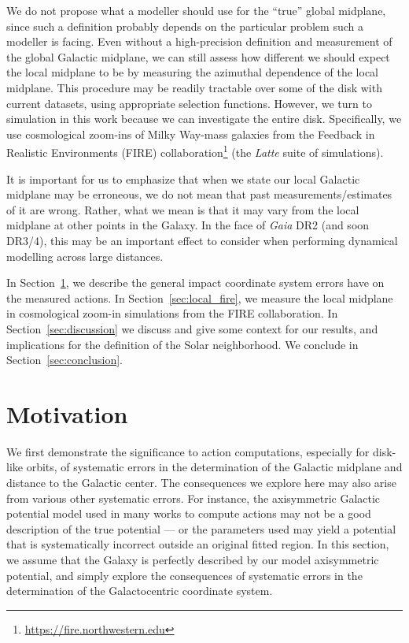 \documentclass[twocolumn]{aastex62}
\begin{document}
We do not propose what a modeller should use for the ``true'' global midplane,
since such a definition probably depends on the particular problem such a
modeller is facing. Even without a high-precision definition and measurement
of the global Galactic midplane, we can still assess how different we should
expect the local midplane to be by measuring the azimuthal dependence of the
local midplane. This procedure may be readily tractable over some of the disk
with current datasets, using appropriate selection functions. However, we turn
to simulation in this work because we can investigate the entire disk.
Specifically, we use cosmological zoom-ins of Milky Way-mass galaxies from the
Feedback in Realistic Environments (FIRE)
collaboration\footnote{\url{https://fire.northwestern.edu}} (the {\em Latte}
suite of simulations).

It is important for us to emphasize that when we state our local Galactic
midplane may be erroneous, we do not mean that past measurements/estimates of
it are wrong. Rather, what we mean is that it may vary from the local midplane
at other points in the Galaxy. In the face of {\em Gaia} DR2 (and soon DR3/4),
this may be an important effect to consider when performing dynamical
modelling across large distances.

In Section~\ref{sec:ref_frame}, we describe the general impact coordinate
system errors have on the measured actions. In Section~\ref{sec:local_fire},
we measure the local midplane in cosmological zoom-in simulations from the
FIRE collaboration. In Section~\ref{sec:discussion} we discuss and give some
context for our results, and implications for the definition of the Solar
neighborhood. We conclude in Section~\ref{sec:conclusion}.

\section{Motivation} \label{sec:ref_frame}
We first demonstrate the significance to action computations, especially for disk-like orbits, of systematic errors in the determination of the Galactic midplane and distance to the Galactic center. The consequences we explore
here may also arise from various other systematic errors. For instance, the
axisymmetric Galactic potential model used in many works to compute actions may not be a good description of the true potential --- or the parameters used may yield a potential that is systematically incorrect outside an original fitted region. In this section, we assume that the Galaxy is perfectly described by our model axisymmetric potential, and simply explore the consequences of systematic errors in the determination of the Galactocentric coordinate system.
\end{document}
